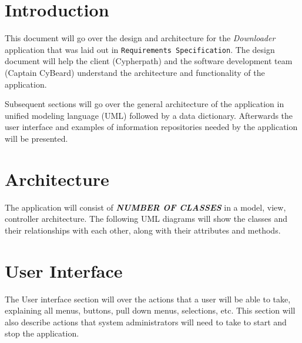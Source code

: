 \documentclass{article}
\title{}
\author{}
\date{}
\begin{document}



\tableofcontents
\newpage
\listoffigures
\newpage

\begin{versionhistory}
\end{versionhistory}
\newpage

\section{Introduction}
This document will go over the design and architecture for the \textit{Downloader} application that was laid out in
\texttt{Requirements Specification}\cite{reqs}. The design document will help the client (Cypherpath) and the
software development team (Captain CyBeard) understand the architecture and functionality of the application.

Subsequent sections will go over the general architecture of the application in unified modeling language
(UML) followed by a data dictionary. Afterwards the user interface and examples of information repositories needed
by the application will be presented.

\section{Architecture}
The application will consist of \textbf{\textit{NUMBER OF CLASSES}} in a model, view, controller architecture. The following
UML diagrams will show the classes and their relationships with each other, along with their attributes and methods.













\section{User Interface}
The User interface section will over the actions that a user will be able to take, explaining all menus, buttons,
pull down menus, selections, etc. This section will also describe actions that system administrators will need to
take to start and stop the application.
\end{document}

